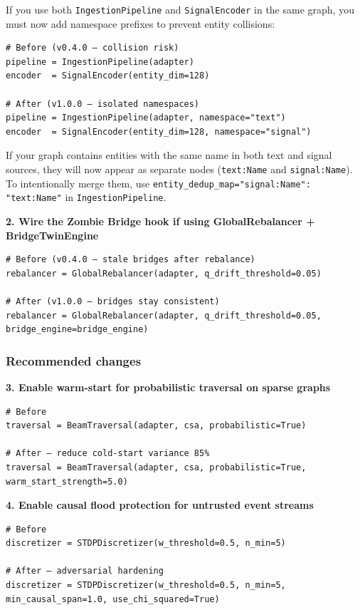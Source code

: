 \documentclass[11pt,article,oneside]{memoir}
\begin{document}
If you use both \texttt{IngestionPipeline} and \texttt{SignalEncoder} in the same graph, you must now add namespace prefixes to prevent entity collisions:

\begin{lstlisting}
# Before (v0.4.0 — collision risk)
pipeline = IngestionPipeline(adapter)
encoder  = SignalEncoder(entity_dim=128)

# After (v1.0.0 — isolated namespaces)
pipeline = IngestionPipeline(adapter, namespace="text")
encoder  = SignalEncoder(entity_dim=128, namespace="signal")
\end{lstlisting}

If your graph contains entities with the same name in both text and signal sources, they will now appear as separate nodes (\texttt{text:Name} and \texttt{signal:Name}). To inten\-tionally merge them, use \texttt{entity\_dedup\_map={"signal:Name": "text:Name"}} in \texttt{IngestionPipeline}.

\textbf{2. Wire the Zombie Bridge hook if using GlobalRebalancer + BridgeTwinEngine}

\begin{lstlisting}
# Before (v0.4.0 — stale bridges after rebalance)
rebalancer = GlobalRebalancer(adapter, q_drift_threshold=0.05)

# After (v1.0.0 — bridges stay consistent)
rebalancer = GlobalRebalancer(adapter, q_drift_threshold=0.05, bridge_engine=bridge_engine)
\end{lstlisting}

\subsubsection{Recommended changes}

\textbf{3. Enable warm-start for proba\-bilistic traversal on sparse graphs}

\begin{lstlisting}
# Before
traversal = BeamTraversal(adapter, csa, probabilistic=True)

# After — reduce cold-start variance 85%
traversal = BeamTraversal(adapter, csa, probabilistic=True, warm_start_strength=5.0)
\end{lstlisting}

\textbf{4. Enable causal flood protection for untrusted event streams}

\begin{lstlisting}
# Before
discretizer = STDPDiscretizer(w_threshold=0.5, n_min=5)

# After — adversarial hardening
discretizer = STDPDiscretizer(w_threshold=0.5, n_min=5, min_causal_span=1.0, use_chi_squared=True)
\end{lstlisting}
\end{document}
